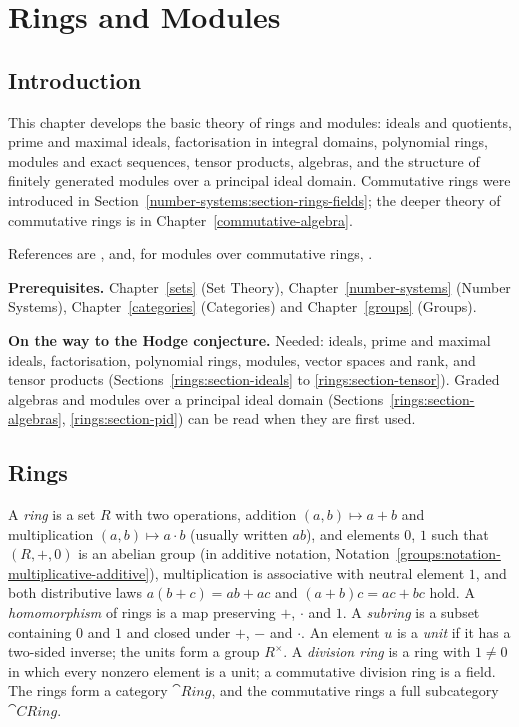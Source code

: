 \chapter{Rings and Modules}\label{rings}

\section{Introduction}\label{rings:section-introduction}

This chapter develops the basic theory of rings and modules: ideals and
quotients, prime and maximal ideals, factorisation in integral domains,
polynomial rings, modules and exact sequences, tensor products, algebras, and
the structure of finitely generated modules over a principal ideal domain.
Commutative rings were introduced in Section~\ref{number-systems:section-rings-fields};
the deeper theory of commutative rings is in Chapter~\ref{commutative-algebra}.

References are \cite{lang-algebra}, \cite{dummit-foote} and, for modules over
commutative rings, \cite{atiyah-macdonald}.

\noindent\textbf{Prerequisites.} Chapter~\ref{sets} (Set Theory),
Chapter~\ref{number-systems} (Number Systems), Chapter~\ref{categories}
(Categories) and Chapter~\ref{groups} (Groups).

\noindent\textbf{On the way to the Hodge conjecture.} Needed: ideals, prime and maximal ideals, factorisation, polynomial rings, modules, vector spaces and rank, and tensor products
(Sections~\ref{rings:section-ideals} to \ref{rings:section-tensor}). Graded algebras and modules over a principal ideal domain (Sections~\ref{rings:section-algebras}, \ref{rings:section-pid}) can be read when they are first used.

\section{Rings}\label{rings:section-rings}

\begin{definition}\label{rings:definition-ring}
A \emph{ring} is a set $R$ with two operations, addition $(a, b) \mapsto a + b$ and
multiplication $(a, b) \mapsto a \cdot b$ (usually written $ab$), and elements $0$, $1$
such that $(R, +, 0)$ is an abelian group (in additive notation,
Notation~\ref{groups:notation-multiplicative-additive}), multiplication is associative with
neutral element $1$, and both distributive laws $a(b + c) = ab + ac$ and
$(a + b)c = ac + bc$ hold. A \emph{homomorphism} of rings is a map preserving $+$,
$\cdot$ and $1$. A \emph{subring} is a subset containing $0$ and $1$ and closed under
$+$, $-$ and $\cdot$. An element $u$ is a \emph{unit} if it has a two-sided inverse;
the units form a group $R^\times$. A \emph{division ring} is a ring with $1 \neq 0$ in
which every nonzero element is a unit; a commutative division ring is a field.
The rings form a category $\cat{Ring}$, and the commutative rings a full subcategory
$\cat{CRing}$.
\end{definition}

